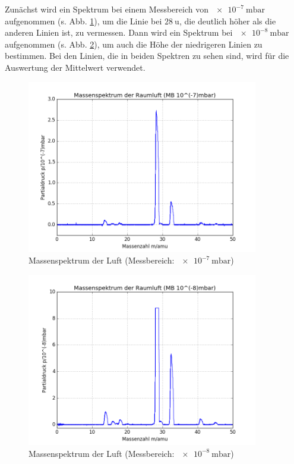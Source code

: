 Zunächst wird ein Spektrum bei einem Messbereich von $\SI{e-7}{\milli\bar}$ aufgenommen (s. Abb. \ref{fig:v41}), um die Linie bei $\SI{28}{\amu}$, die deutlich höher als die anderen Linien ist, zu vermessen. Dann wird ein Spektrum bei $\SI{e-8}{\milli\bar}$ aufgenommen (s. Abb. \ref{fig:v42}), um auch die Höhe der niedrigeren Linien zu bestimmen.
Bei den Linien, die in beiden Spektren zu sehen sind, wird für die Auswertung der Mittelwert verwendet.

\begin{figure}[tb]
	\centering\includegraphics[width=0.9\textwidth]{fig/a4_1.png}
	\caption{Massenspektrum der Luft (Messbereich: $\SI{e-7}{\milli\bar}$)}
	\label{fig:v41}
\end{figure}

\begin{figure}[tb]
	\centering\includegraphics[width=0.9\textwidth]{fig/a4_2.png}
	\caption{Massenspektrum der Luft (Messbereich: $\SI{e-8}{\milli\bar}$)}
	\label{fig:v42}
\end{figure}

